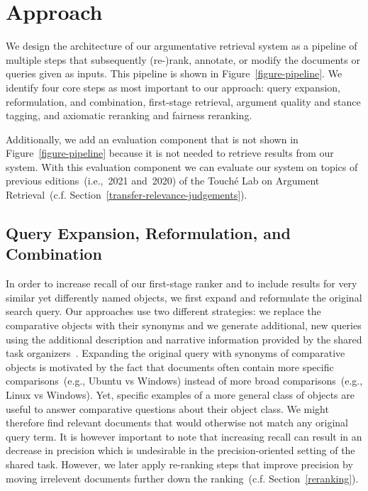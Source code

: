 \section{Approach}\label{approach}



We design the architecture of our argumentative retrieval system as a pipeline of multiple steps that subsequently (re-)rank, annotate, or modify the documents or queries given as inputs. This pipeline is shown in Figure~\ref{figure-pipeline}.
We identify four core steps as most important to our approach:
\Ni query expansion, reformulation, and combination,
\Nii first-stage retrieval,
\Niii argument quality and stance tagging,
and \Niv axiomatic reranking and fairness reranking.

Additionally, we add an evaluation component that is not shown in Figure~\ref{figure-pipeline} because it is not needed to retrieve results from our system.
With this evaluation component we can evaluate our system on topics of previous editions~(i.e.,~2021 and~2020) of the Touché Lab on Argument Retrieval~(c.f. Section~\ref{transfer-relevance-judgements}).

\subsection{Query Expansion, Reformulation, and Combination}
\label{reformulation}

In order to increase recall of our first-stage ranker and to include results for very similar yet differently named objects, we first expand and reformulate the original search query.
Our approaches use two different strategies: \Ni we replace the comparative objects with their synonyms and \Nii we generate additional, new queries using the additional description and narrative information provided by the shared task organizers~\cite{BondarenkoFKSGBPBSWPH2022}.
Expanding the original query with synonyms of comparative objects is motivated by the fact that documents often contain more specific comparisons~(e.g., Ubuntu vs Windows) instead of more broad comparisons~(e.g., Linux vs Windows).
Yet, specific examples of a more general class of objects are useful to answer comparative questions about their object class.
We might therefore find relevant documents that would otherwise not match any original query term.
It is however important to note that increasing recall can result in an decrease in precision which is undesirable in the precision-oriented setting of the shared task.
However, we later apply re-ranking steps that improve precision by moving irrelevent documents further down the ranking~(c.f. Section~\ref{reranking}).

